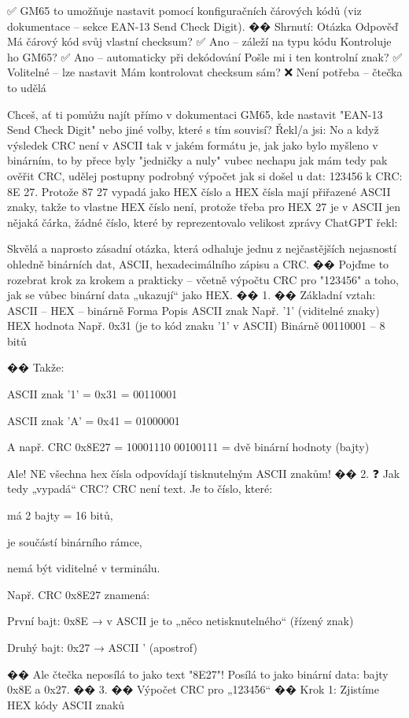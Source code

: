 ✅ GM65 to umožňuje nastavit pomocí konfiguračních čárových kódů (viz dokumentace – sekce EAN-13 Send Check Digit).
�� Shrnutí:
Otázka	Odpověď
Má čárový kód svůj vlastní checksum?	✅ Ano – záleží na typu kódu
Kontroluje ho GM65?	✅ Ano – automaticky při dekódování
Pošle mi i ten kontrolní znak?	✅ Volitelné – lze nastavit
Mám kontrolovat checksum sám?	❌ Není potřeba – čtečka to udělá

Chceš, ať ti pomůžu najít přímo v dokumentaci GM65, kde nastavit "EAN-13 Send Check Digit" nebo jiné volby, které s tím souvisí?
Řekl/a jsi:
No a když výsledek CRC není v ASCII tak v jakém formátu je, jak jako bylo myšleno v binárním, to by přece byly "jedničky a nuly" vubec nechapu jak mám tedy pak ověřit CRC, udělej postupny podrobný výpočet jak si došel u dat: 123456 k CRC: 8E 27. Protože 87 27 vypadá jako HEX číslo a HEX čísla mají přiřazené ASCII znaky, takže to vlastne HEX číslo není, protože třeba pro HEX 27 je v ASCII jen nějaká čárka, žádné číslo, které by reprezentovalo velikost zprávy
ChatGPT řekl:

Skvělá a naprosto zásadní otázka, která odhaluje jednu z nejčastějších nejasností ohledně binárních dat, ASCII, hexadecimálního zápisu a CRC. ��
Pojďme to rozebrat krok za krokem a prakticky – včetně výpočtu CRC pro "123456" a toho, jak se vůbec binární data „ukazují“ jako HEX.
�� 1. �� Základní vztah: ASCII – HEX – binárně
Forma	Popis
ASCII znak	Např. '1' (viditelné znaky)
HEX hodnota	Např. 0x31 (je to kód znaku '1' v ASCII)
Binárně	00110001 – 8 bitů

�� Takže:

    ASCII znak '1' = 0x31 = 00110001

    ASCII znak 'A' = 0x41 = 01000001

    A např. CRC 0x8E27 = 10001110 00100111 = dvě binární hodnoty (bajty)

Ale! NE všechna hex čísla odpovídají tisknutelným ASCII znakům!
�� 2. ❓ Jak tedy „vypadá“ CRC?
CRC není text. Je to číslo, které:

    má 2 bajty = 16 bitů,

    je součástí binárního rámce,

    nemá být viditelné v terminálu.

Např. CRC 0x8E27 znamená:

    První bajt: 0x8E → v ASCII je to „něco netisknutelného“ (řízený znak)

    Druhý bajt: 0x27 → ASCII ' (apostrof)

�� Ale čtečka neposílá to jako text "8E27"!
Posílá to jako binární data: bajty 0x8E a 0x27.
�� 3. �� Výpočet CRC pro „123456“
�� Krok 1: Zjistíme HEX kódy ASCII znaků

